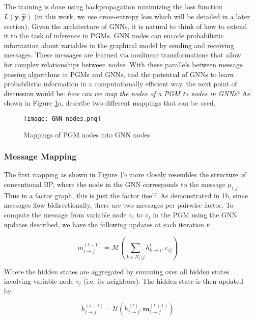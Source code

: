 \documentclass{article}
\begin{document}
The training is done using backpropagation minimizing the loss function $L(\bm{y}, \bm{\hat{y}})$ (in this work, we use cross-entropy loss which will be detailed in a later section). Given the architecture of GNNs, it is natural to think of how to extend it to the task of inference in PGMs. GNN nodes can encode probabilistic information about variables in the graphical model by sending and receiving messages. These messages are learned via nonlinear transformations that allow for complex relationships between nodes. With these parallels between message passing algorithms in PGMs and GNNs, and the potential of GNNs to learn probabilistic information in a computationally efficient way, the next point of discussion would be: \textit{how can we map the nodes of a PGM to nodes in GNNs}? As shown in Figure \ref{fig: mappings}a, \cite{inf_pgm_gnn} describe two different mappings that can be used. 
\begin{figure}
  \centering
  \texttt{[image: GNN\_nodes.png]} %
  \caption{Mappings of PGM nodes into GNN nodes}
  \label{fig: mappings}
\end{figure}
\subsubsection{Message Mapping}

The first mapping as shown in Figure \ref{fig: mappings}b more closely resembles the structure of conventional BP, where the node in the GNN corresponds to the message $\mu_{i,j}$. Thus in a factor graph, this is just the factor itself. As demonstrated in \ref{fig: mappings}b, since messages flow bidirectionally, there are two messages per pairwise factor. To compute the message from variable node $v_i$ to $v_j$ in the PGM using the GNN updates described, we have the following updates at each iteration $t$:

\begin{equation}
m^{(t+1)}_{i \to j} = \mathcal{M}\left(\sum_{k \in N_{i} \setminus {j}} h^t_{k \to i}, e_{ij}\right)
\end{equation}

Where the hidden states are aggregated by summing over all hidden states involving variable node $v_i$ (i.e. its neighbors).  The hidden state is then updated by:

\begin{equation}
    h_{i \to j}^{(t+1)} = \mathcal{U}(h_{i \to j}^{(t)}, \bm{m}_{i \to j}^{(t + 1)})
\end{equation}
\end{document}
